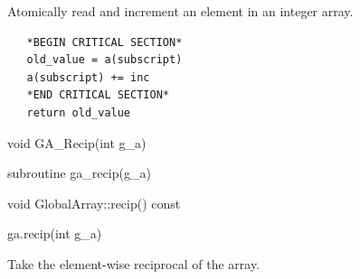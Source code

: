 \documentclass[12pt]{article}
\begin{document}
\ncoll

\begin{desc}

Atomically read and increment an element in an integer array.

\begin{verbatim}
   *BEGIN CRITICAL SECTION*
   old_value = a(subscript)
   a(subscript) += inc
   *END CRITICAL SECTION*
   return old_value
\end{verbatim}

\end{desc}


\begin{capi}
\begin{ccode}
void GA_Recip(int g_a)
\end{ccode}
\begin{funcargs}
\end{funcargs}
\end{capi}

\begin{fapi}
\begin{fcode}
subroutine ga_recip(g_a)
\end{fcode}
\begin{funcargs}
\end{funcargs}
\end{fapi}

\begin{cxxapi}
\begin{cxxcode}
void GlobalArray::recip() const
\end{cxxcode}
\end{cxxapi}

\begin{pyapi}
\begin{pycode}
ga.recip(int g_a)
\end{pycode}
\begin{funcargs}
\end{funcargs}
\end{pyapi}

\gcoll

\begin{desc}
Take the element-wise reciprocal of the array.
\end{desc}

\end{document}
